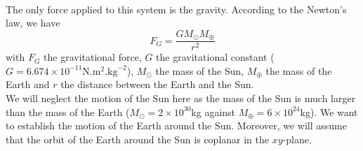 \documentclass[a4paper, twoside, 11pt]{report}
\theoremstyle{theorem}
\theoremstyle{remark}
\theoremstyle{exemple}
\begin{document}
            \paragraph{}The only force applied to this system is the gravity. According to the Newton's law, we have 
                \begin{equation*}
                F_G = \frac{GM_{\odot}M_{\oplus}}{r^2}
                \end{equation*}
            with $F_G$ the gravitational force, $G$ the gravitational constant ($G=6.674 \times 10^{-11} \mathrm{N}.\mathrm{m}^2.\mathrm{kg}^{-2}$), $M_{\odot}$ the mass of the Sun, $M_{\oplus}$ the mass of the Earth and $r$ the distance between the Earth and the Sun.\\
            We will neglect the motion of the Sun here as the mass of the Sun is much larger than the mass of the Earth ($M_{\odot} = 2 \times 10^{30}$kg against $M_{\oplus} = 6 \times 10^{24}$kg). We want to establish the motion of the Earth around the Sun. Moreover, we will assume that the orbit of the Earth around the Sun is coplanar in the $xy$-plane.
\end{document}
